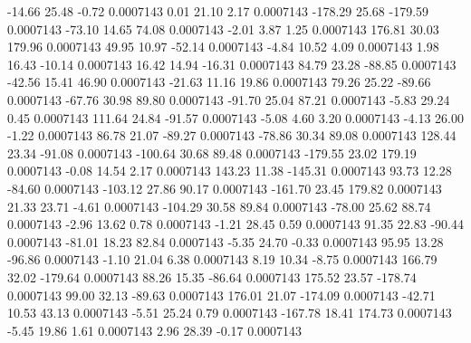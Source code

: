       -14.66       25.48       -0.72     0.0007143
        0.01       21.10        2.17     0.0007143
     -178.29       25.68     -179.59     0.0007143
      -73.10       14.65       74.08     0.0007143
       -2.01        3.87        1.25     0.0007143
      176.81       30.03      179.96     0.0007143
       49.95       10.97      -52.14     0.0007143
       -4.84       10.52        4.09     0.0007143
        1.98       16.43      -10.14     0.0007143
       16.42       14.94      -16.31     0.0007143
       84.79       23.28      -88.85     0.0007143
      -42.56       15.41       46.90     0.0007143
      -21.63       11.16       19.86     0.0007143
       79.26       25.22      -89.66     0.0007143
      -67.76       30.98       89.80     0.0007143
      -91.70       25.04       87.21     0.0007143
       -5.83       29.24        0.45     0.0007143
      111.64       24.84      -91.57     0.0007143
       -5.08        4.60        3.20     0.0007143
       -4.13       26.00       -1.22     0.0007143
       86.78       21.07      -89.27     0.0007143
      -78.86       30.34       89.08     0.0007143
      128.44       23.34      -91.08     0.0007143
     -100.64       30.68       89.48     0.0007143
     -179.55       23.02      179.19     0.0007143
       -0.08       14.54        2.17     0.0007143
      143.23       11.38     -145.31     0.0007143
       93.73       12.28      -84.60     0.0007143
     -103.12       27.86       90.17     0.0007143
     -161.70       23.45      179.82     0.0007143
       21.33       23.71       -4.61     0.0007143
     -104.29       30.58       89.84     0.0007143
      -78.00       25.62       88.74     0.0007143
       -2.96       13.62        0.78     0.0007143
       -1.21       28.45        0.59     0.0007143
       91.35       22.83      -90.44     0.0007143
      -81.01       18.23       82.84     0.0007143
       -5.35       24.70       -0.33     0.0007143
       95.95       13.28      -96.86     0.0007143
       -1.10       21.04        6.38     0.0007143
        8.19       10.34       -8.75     0.0007143
      166.79       32.02     -179.64     0.0007143
       88.26       15.35      -86.64     0.0007143
      175.52       23.57     -178.74     0.0007143
       99.00       32.13      -89.63     0.0007143
      176.01       21.07     -174.09     0.0007143
      -42.71       10.53       43.13     0.0007143
       -5.51       25.24        0.79     0.0007143
     -167.78       18.41      174.73     0.0007143
       -5.45       19.86        1.61     0.0007143
        2.96       28.39       -0.17     0.0007143
